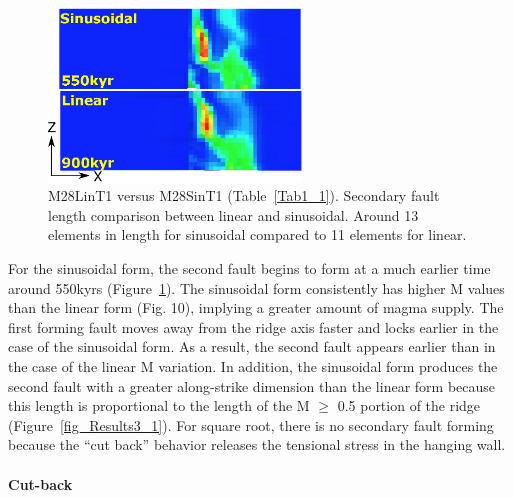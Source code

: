 \begin{figure}[h]
  \centering
    \includegraphics[width=0.6\textwidth]{./Figures/fig_Results4_2_secondary_fault_length_comparison.eps}
  \caption{M28LinT1 versus M28SinT1 (Table~\hyperref[Tab1_1]{\ref{Tab1_1}}). Secondary fault length comparison between linear and sinusoidal. Around 13 elements in length for sinusoidal compared to 11 elements for linear.}
 \label{fig_Results4_2}
\end{figure}   

For the sinusoidal form, the second fault begins to form at a much earlier time around 550kyrs (Figure~\hyperref[fig_Results4_2]{\ref{fig_Results4_2}}). The sinusoidal form consistently has higher M values than the linear form (Fig. 10), implying a greater amount of magma supply. %
The first forming fault moves away from the ridge axis faster and locks earlier in the case of the sinusoidal form. As a result, the second fault appears earlier than in the case of the linear M variation. In addition, the sinusoidal form produces the second fault with a greater along-strike dimension than the linear form because this length is proportional to the length of the M $\ge$ 0.5 portion of the ridge (Figure~\hyperref[fig_Results3_1]{\ref{fig_Results3_1}}). 
For square root, there is no secondary fault forming because the ``cut back'' behavior releases the tensional stress in the hanging wall.

\paragraph{Cut-back}\label{para_CutBack}

